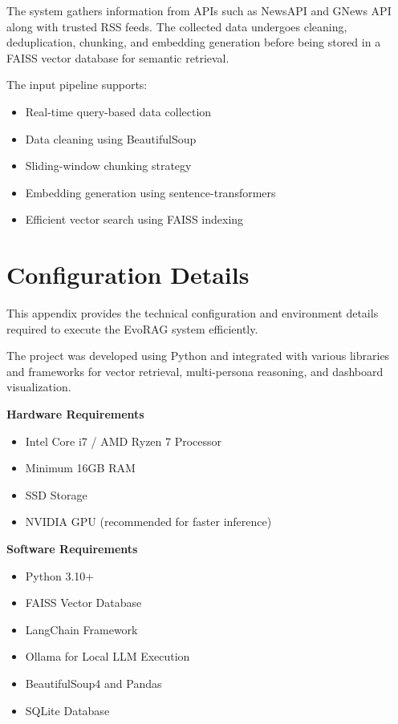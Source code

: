\begin{appendices}
The system gathers information from APIs such as NewsAPI and GNews API along with trusted RSS feeds. 
The collected data undergoes cleaning, deduplication, chunking, and embedding generation before being stored in a FAISS vector database for semantic retrieval.

The input pipeline supports:
\begin{itemize}
    \item Real-time query-based data collection
    \item Data cleaning using BeautifulSoup
    \item Sliding-window chunking strategy
    \item Embedding generation using sentence-transformers
    \item Efficient vector search using FAISS indexing
\end{itemize}


\chapter{Configuration Details}

This appendix provides the technical configuration and environment details required to execute the EvoRAG system efficiently.

The project was developed using Python and integrated with various libraries and frameworks for vector retrieval, multi-persona reasoning, and dashboard visualization.

\textbf{Hardware Requirements}
\begin{itemize}
    \item Intel Core i7 / AMD Ryzen 7 Processor
    \item Minimum 16GB RAM
    \item SSD Storage
    \item NVIDIA GPU (recommended for faster inference)
\end{itemize}

\textbf{Software Requirements}
\begin{itemize}
    \item Python 3.10+
    \item FAISS Vector Database
    \item LangChain Framework
    \item Ollama for Local LLM Execution
    \item BeautifulSoup4 and Pandas
    \item SQLite Database
\end{itemize}


\end{appendices}
